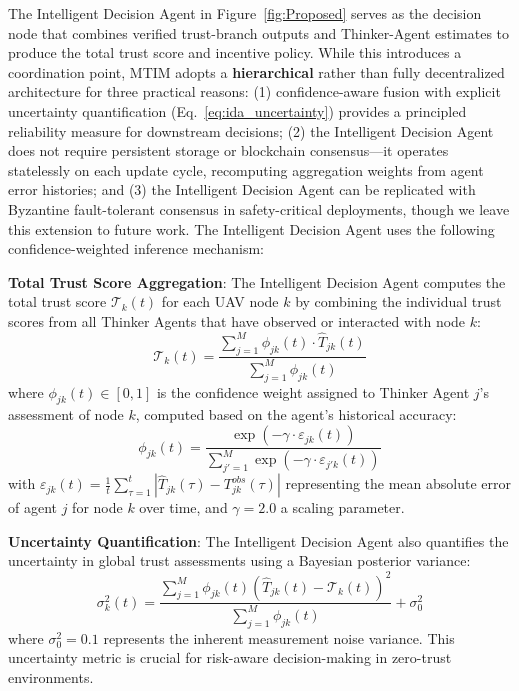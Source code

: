 \documentclass[notspecified,article,submit,moreauthors]{Definitions/mdpi}
\begin{document}
The Intelligent Decision Agent in Figure~\ref{fig:Proposed} serves as the decision node that combines verified trust-branch outputs and Thinker-Agent estimates to produce the total trust score and incentive policy. While this introduces a coordination point, MTIM adopts a \textbf{hierarchical} rather than fully decentralized architecture for three practical reasons: (1) confidence-aware fusion with explicit uncertainty quantification (Eq.~\ref{eq:ida_uncertainty}) provides a principled reliability measure for downstream decisions; (2) the Intelligent Decision Agent does not require persistent storage or blockchain consensus---it operates statelessly on each update cycle, recomputing aggregation weights from agent error histories; and (3) the Intelligent Decision Agent can be replicated with Byzantine fault-tolerant consensus in safety-critical deployments, though we leave this extension to future work. The Intelligent Decision Agent uses the following confidence-weighted inference mechanism:

\textbf{Total Trust Score Aggregation}: The Intelligent Decision Agent computes the total trust score $\mathcal{T}_k(t)$ for each UAV node $k$ by combining the individual trust scores from all Thinker Agents that have observed or interacted with node $k$:
\begin{equation}\label{eq:ida_global}
\mathcal{T}_k(t) = \frac{\sum_{j=1}^{M} \phi_{jk}(t) \cdot \hat{T}_{jk}(t)}{\sum_{j=1}^{M} \phi_{jk}(t)}
\end{equation}
where $\phi_{jk}(t) \in [0, 1]$ is the confidence weight assigned to Thinker Agent $j$'s assessment of node $k$, computed based on the agent's historical accuracy:
\begin{equation}\label{eq:ida_weight}
\phi_{jk}(t) = \frac{\exp\left(-\gamma \cdot \varepsilon_{jk}(t)\right)}{\sum_{j'=1}^{M} \exp\left(-\gamma \cdot \varepsilon_{j'k}(t)\right)}
\end{equation}
with $\varepsilon_{jk}(t) = \frac{1}{t} \sum_{\tau=1}^{t} \left| \hat{T}_{jk}(\tau) - T_{jk}^{obs}(\tau) \right|$ representing the mean absolute error of agent $j$ for node $k$ over time, and $\gamma = 2.0$ a scaling parameter.

\textbf{Uncertainty Quantification}: The Intelligent Decision Agent also quantifies the uncertainty in global trust assessments using a Bayesian posterior variance:
\begin{equation}\label{eq:ida_uncertainty}
\sigma_k^2(t) = \frac{\sum_{j=1}^{M} \phi_{jk}(t) \left( \hat{T}_{jk}(t) - \mathcal{T}_k(t) \right)^2}{\sum_{j=1}^{M} \phi_{jk}(t)} + \sigma_0^2
\end{equation}
where $\sigma_0^2 = 0.1$ represents the inherent measurement noise variance. This uncertainty metric is crucial for risk-aware decision-making in zero-trust environments.
\end{document}
